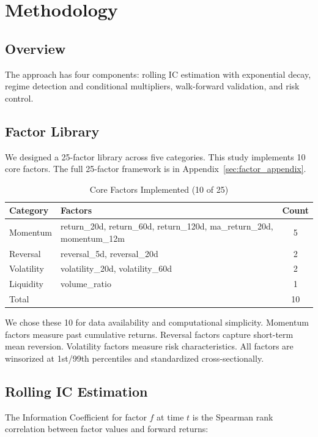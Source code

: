 \section{Methodology}
\label{sec:methodology}

\subsection{Overview}

The approach has four components: rolling IC estimation with exponential decay, regime detection and conditional multipliers, walk-forward validation, and risk control.

\subsection{Factor Library}

We designed a 25-factor library across five categories. This study implements 10 core factors. The full 25-factor framework is in Appendix~\ref{sec:factor_appendix}.

\begin{table}[h]
\centering
\caption{Core Factors Implemented (10 of 25)}
\label{tab:factors}
\begin{tabular}{llc}
\toprule
Category & Factors & Count \\
\midrule
Momentum & return\_20d, return\_60d, return\_120d, ma\_return\_20d, momentum\_12m & 5 \\
Reversal & reversal\_5d, reversal\_20d & 2 \\
Volatility & volatility\_20d, volatility\_60d & 2 \\
Liquidity & volume\_ratio & 1 \\
\midrule
Total & & 10 \\
\bottomrule
\end{tabular}
\end{table}

We chose these 10 for data availability and computational simplicity. Momentum factors measure past cumulative returns. Reversal factors capture short-term mean reversion. Volatility factors measure risk characteristics. All factors are winsorized at 1st/99th percentiles and standardized cross-sectionally.

\subsection{Rolling IC Estimation}

The Information Coefficient for factor $f$ at time $t$ is the Spearman rank correlation between factor values and forward returns:

